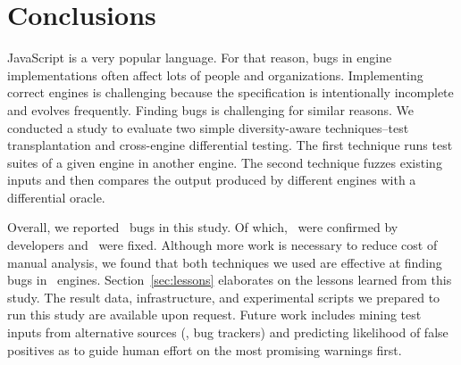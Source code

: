 \documentclass[sigconf,review, anonymous]{acmart}
\begin{document}
\section{Conclusions}


JavaScript is a very popular language. For that reason, bugs in engine
implementations often affect lots of people and organizations.
Implementing correct engines is challenging because the specification
is intentionally incomplete and evolves frequently. Finding bugs is
challenging for similar reasons. We conducted a study to evaluate two
simple diversity-aware techniques--test transplantation and
cross-engine differential testing. The first technique runs test
suites of a given engine in another engine. The second technique
fuzzes existing inputs and then compares the output produced by
different engines with a differential oracle.

Overall, we reported \totalBugsReported\ bugs in this study. Of which,
\totalBugsConfirmed\ were confirmed by developers and
\totalBugsFixed\ were fixed. Although more work is necessary to
reduce cost of manual analysis, we found that both techniques we used
are effective at finding bugs in
\js\ engines. Section~\ref{sec:lessons} elaborates on the lessons
learned from this study. The result data, infrastructure, and
experimental scripts we prepared to run this study are available upon
request. Future work includes mining test inputs from alternative
sources (\eg{}, bug trackers) and predicting likelihood of false
positives as to guide human effort on the most promising warnings
first.

\balance


\end{document}

